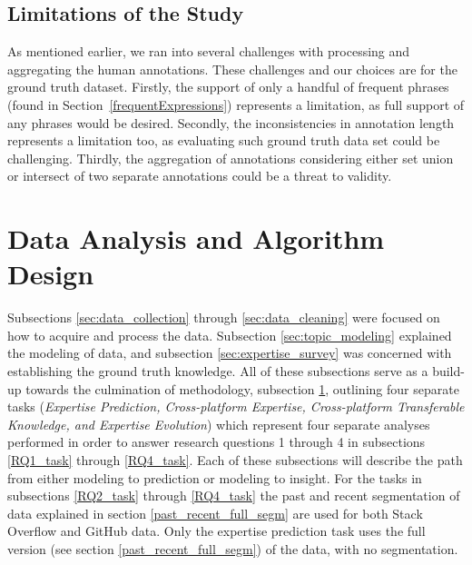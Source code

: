         \subsection{Limitations of the Study}
            As mentioned earlier, we ran into several challenges with processing and aggregating the human annotations. These challenges and our choices are for the ground truth dataset. Firstly, the support of only a handful of frequent phrases (found in Section~\ref{frequentExpressions}) represents a limitation, as full support of any phrases would be desired. Secondly, the inconsistencies in annotation length represents a limitation too, as evaluating such ground truth data set could be challenging. Thirdly, the aggregation of annotations considering either set union or intersect of two separate annotations could be a threat to validity. 
        
\section{Data Analysis and Algorithm Design} \label{sec:algo_design}

    Subsections \ref{sec:data_collection} through \ref{sec:data_cleaning} were focused on how to acquire and process the data. Subsection \ref{sec:topic_modeling} explained the modeling of data, and subsection \ref{sec:expertise_survey} was concerned with establishing the ground truth knowledge. All of these subsections serve as a build-up towards the culmination of methodology, subsection \ref{sec:algo_design}, outlining four separate tasks (\emph{Expertise Prediction, Cross-platform Expertise, Cross-platform Transferable Knowledge, and Expertise Evolution}) which represent four separate analyses performed in order to answer research questions 1 through 4 in subsections \ref{RQ1_task} through \ref{RQ4_task}. Each of these subsections will describe the path from either modeling to prediction or modeling to insight. For the tasks in subsections \ref{RQ2_task} through \ref{RQ4_task} the past and recent segmentation of data explained in section \ref{past_recent_full_segm} are used for both Stack Overflow and GitHub data. Only the expertise prediction task uses the full version (see section \ref{past_recent_full_segm}) of the data, with no segmentation. 
    
